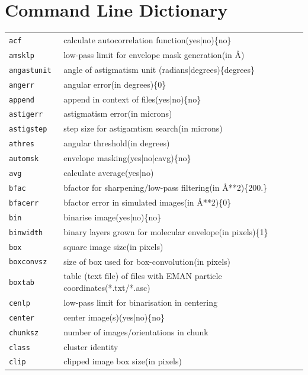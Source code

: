 \documentclass[a4paper,11pt]{article}
\begin{document}
\section{Command Line Dictionary}
\begin{tabular}{ll}
\texttt{acf          }&{ calculate autocorrelation function(yes|no)\{no\}}\\
\texttt{amsklp       }&{ low-pass limit for envelope mask generation(in \AA{})}\\
\texttt{angastunit   }&{ angle of astigmatism unit (radians|degrees)\{degrees\}}\\
\texttt{angerr       }&{ angular error(in degrees)\{0\}}\\
\texttt{append       }&{ append in context of files(yes|no)\{no\}}\\
\texttt{astigerr     }&{ astigmatism error(in microns)}\\
\texttt{astigstep    }&{ step size for astigamtism search(in microns)}\\
\texttt{athres       }&{ angular threshold(in degrees)}\\
\texttt{automsk      }&{ envelope masking(yes|no|cavg)\{no\}}\\
\texttt{avg          }&{ calculate average(yes|no)}\\
\texttt{bfac         }&{ bfactor for sharpening/low-pass filtering(in \AA{}**2)\{200.\}}\\
\texttt{bfacerr      }&{ bfactor error in simulated images(in \AA{}**2)\{0\}}\\
\texttt{bin          }&{ binarise image(yes|no)\{no\}}\\
\texttt{binwidth     }&{ binary layers grown for molecular envelope(in pixels)\{1\}}\\
\texttt{box          }&{ square image size(in pixels)}\\
\texttt{boxconvsz    }&{ size of box used for box-convolution(in pixels)}\\
\texttt{boxtab       }&{ table (text file) of files with EMAN particle coordinates(*.txt/*.asc)}\\
\texttt{cenlp        }&{ low-pass limit for binarisation in centering}\\
\texttt{center       }&{ center image(s)(yes|no)\{no\}}\\
\texttt{chunksz      }&{ number of images/orientations in chunk}\\
\texttt{class        }&{ cluster identity}\\
\texttt{clip         }&{ clipped image box size(in pixels)}\\

\end{tabular}
\end{document}

